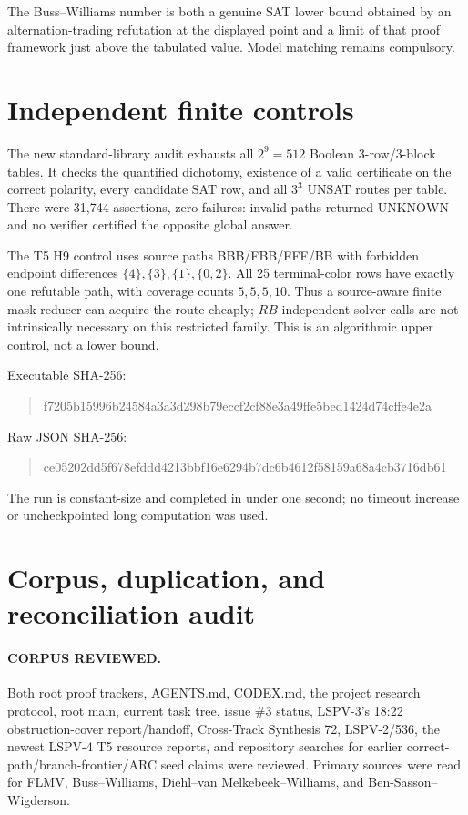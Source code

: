 \documentclass[11pt]{article}
\newcommand{\UNKNOWN}{\mathrm{UNKNOWN}}
\begin{document}
The Buss--Williams number is both a genuine SAT lower bound obtained by an alternation-trading refutation at the displayed point and a limit of that proof framework just above the tabulated value.  Model matching remains compulsory.

\section{Independent finite controls}

The new standard-library audit exhausts all $2^9=512$ Boolean $3$-row/$3$-block tables.  It checks the quantified dichotomy, existence of a valid certificate on the correct polarity, every candidate SAT row, and all $3^3$ UNSAT routes per table.  There were 31,744 assertions, zero failures: invalid paths returned $\UNKNOWN$ and no verifier certified the opposite global answer.

The T5 H9 control uses source paths BBB/FBB/FFF/BB with forbidden endpoint differences $\{4\},\{3\},\{1\},\{0,2\}$.  All 25 terminal-color rows have exactly one refutable path, with coverage counts $5,5,5,10$.  Thus a source-aware finite mask reducer can acquire the route cheaply; $RB$ independent solver calls are not intrinsically necessary on this restricted family.  This is an algorithmic upper control, not a lower bound.

Executable SHA-256:
\begin{quote}\ttfamily
f7205b15996b24584a3a3d298b79eccf2cf88e3a49ffe5bed1424d74cffe4e2a
\end{quote}
Raw JSON SHA-256:
\begin{quote}\ttfamily
ce05202dd5f678efddd4213bbf16e6294b7dc6b4612f58159a68a4cb3716db61
\end{quote}
The run is constant-size and completed in under one second; no timeout increase or uncheckpointed long computation was used.

\section{Corpus, duplication, and reconciliation audit}

\paragraph{CORPUS REVIEWED.}
Both root proof trackers, AGENTS.md, CODEX.md, the project research protocol, root main, current task tree, issue \#3 status, LSPV-3's 18:22 obstruction-cover report/handoff, Cross-Track Synthesis 72, LSPV-2/536, the newest LSPV-4 T5 resource reports, and repository searches for earlier correct-path/branch-frontier/ARC seed claims were reviewed.  Primary sources were read for FLMV, Buss--Williams, Diehl--van Melkebeek--Williams, and Ben-Sasson--Wigderson.
\end{document}
